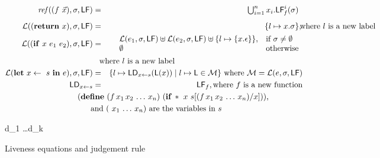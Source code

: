 \documentclass{sig-alternate}
\def\myvec{\mathaccent"017E } %
\begin{document}
\begin{figure*}[t]
\begin{eqnarray*}
\mathit{ref\/}((f~\myvec{x}),\sigma,\Lfonly)
          &=&  \begin{array}{@{}l}  %
               \bigcup_{i=1}^n x_i.\Lf{f}{i}{\sigma}
               \end{array}
\\[1ex]
\mathcal{L}((\RETURN~x),\sigma,\Lfonly) &=& \{l \mapsto x.\sigma\}, \makebox[0mm]{\hspace*{3cm} where $l$ is a new label} \\
\mathcal{L}((\SIF~x~e_1~e_2),\sigma,\Lfonly) &=&
        \begin{array}{l l}
                    \mathcal{L}(e_1,\sigma,\Lfonly) \uplus
        \mathcal{L}(e_2,\sigma,\Lfonly) \uplus
        \{l \mapsto  \{x.\epsilon\}\},  & \mbox{if}~\sigma \ne \emptyset\\
        \emptyset  & \mbox{otherwise}
                 \end{array} \\
 \makebox[0mm]{\hspace*{3.8cm} where $l$ is a new label}\\
\mathcal{L}(\LET~x \leftarrow~s~\IN~e),\sigma,\Lfonly) &=&
        \{ l \mapsto \Ldonly_{x \leftarrow s}(\Lv(x)) \mid l \mapsto \Lv
        \in \mathcal{M}\}
\mbox{ where } \mathcal{M} = \mathcal{L}(e,\sigma,\Lfonly)\\
\Ldonly_{x \leftarrow s} &=& \Lfonly_f, \mbox{where}~f~\mbox{is a new function}\\
 \makebox[0mm]{\hspace*{7cm}   
 $(\DEFINE~(f\,x_1\,x_2\, \ldots \, x_n)~(\SIF\,*~x~s[(f\,x_1\,
           x_2\, \ldots\, x_n)/x]))$,} \\
 \makebox[0mm]{\hspace*{5.5cm} and 
     $(\ x_1\, \ldots\, x_n)$ are the variables in $s$}
\end{eqnarray*}
\begin{minipage}{0.85\textwidth}
        { d_1 \ldots d_k \len \Lfonly
\\ }
\end{minipage}
  \caption{Liveness equations and judgement rule}\label{fig:live-judge}
\end{figure*}
\end{document}
